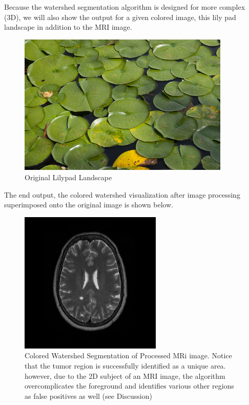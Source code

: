 \documentclass[12pt]{article}
\theoremstyle{plain}%
\theoremstyle{definition}
\theoremstyle{remark}
\begin{document}
Because the watershed segmentation algorithm is designed for more complex (3D), we will also show the output for a given colored image, this lily pad landscape in addition to the MRI image.

\begin{figure}[!h]
	\centering
		\includegraphics[width=0.9\textwidth]{lilypad.jpg}
	\caption{Original Lilypad Landscape}
\end{figure}

The end output, the colored watershed visualization after image processing superimposed onto the original image is shown below.

\begin{figure}[!h]
	\centering
		\includegraphics{original.jpg}
	\caption{Colored Watershed Segmentation of Processed MRi image.  Notice that the tumor region is successfully identified as a unique area.  however, due to the 2D subject of an MRI image, the algorithm overcomplicates the foreground and identifies various other regions as false positives as well (see Discussion)}
\end{figure}
\end{document}
